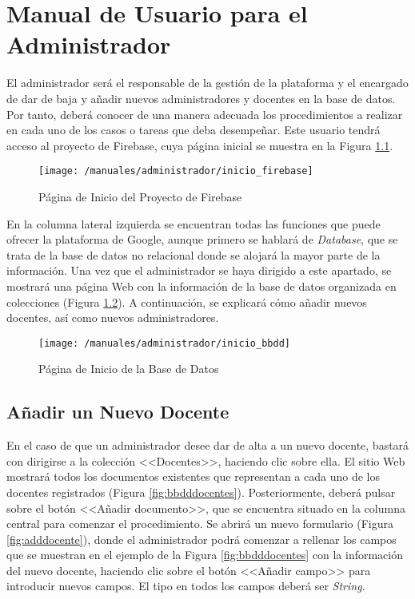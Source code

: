 \chapter{Manual de Usuario para el Administrador}
\label{chap:manadmin}

El administrador será el responsable de la gestión de la plataforma y el encargado de dar de baja y añadir nuevos administradores y docentes en la base de datos. Por tanto, deberá conocer de una manera adecuada los procedimientos a realizar en cada uno de los casos o tareas que deba desempeñar. Este usuario tendrá acceso al proyecto de Firebase, cuya página inicial se muestra en la Figura \ref{fig:iniciofirebase}.

\begin{figure}[!h]
	\begin{center}
		\texttt{[image: /manuales/administrador/inicio\_firebase]}
		\caption{Página de Inicio del Proyecto de Firebase}
		\label{fig:iniciofirebase}
	\end{center}
\end{figure}

\clearpage

En la columna lateral izquierda se encuentran todas las funciones que puede ofrecer la plataforma de Google, aunque primero se hablará de \textit{Database}, que se trata de la base de datos no relacional donde se alojará la mayor parte de la información. Una vez que el administrador se haya dirigido a este apartado, se mostrará una página Web con la información de la base de datos organizada en colecciones (Figura \ref{fig:iniciobbdd}). A continuación, se explicará cómo añadir nuevos docentes, así como nuevos administradores.

\begin{figure}[!h]
	\begin{center}
		\texttt{[image: /manuales/administrador/inicio\_bbdd]}
		\caption{Página de Inicio de la Base de Datos}
		\label{fig:iniciobbdd}
	\end{center}
\end{figure}

\clearpage

\section*{Añadir un Nuevo Docente}
En el caso de que un administrador desee dar de alta a un nuevo docente, bastará con dirigirse a la colección <<Docentes>>, haciendo clic sobre ella. El sitio Web mostrará todos los documentos existentes que representan a cada uno de los docentes registrados (Figura \ref{fig:bbdddocentes}). Posteriormente, deberá pulsar sobre el botón <<Añadir documento>>, que se encuentra situado en la columna central para comenzar el procedimiento. Se abrirá un nuevo formulario (Figura \ref{fig:adddocente}), donde el administrador podrá comenzar a rellenar los campos que se muestran en el ejemplo de la Figura \ref{fig:bbdddocentes} con la información del nuevo docente, haciendo clic sobre el botón <<Añadir campo>> para introducir nuevos campos. El tipo en todos los campos deberá ser \textit{String}.

